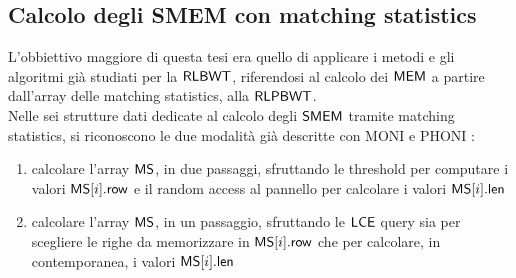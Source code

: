 \subsection{Calcolo degli SMEM con matching statistics}
L'obbiettivo maggiore di questa tesi era quello di applicare i metodi e gli
algoritmi già 
studiati per la $\mbox{\rm {\sf RLBWT}}$, riferendosi al calcolo dei $\mbox{\rm {\sf MEM}}$ a partire
dall'array delle matching statistics, alla $\mbox{\rm {\sf RLPBWT}}$.\\
Nelle sei strutture dati dedicate al calcolo degli $\mbox{\rm {\sf SMEM}}$ tramite matching
statistics, si riconoscono le due modalità già descritte con MONI \cite{moni} e
PHONI \cite{phoni}:
\begin{enumerate}
  \item calcolare l'array $\mbox{\rm {\sf MS}}$, in due passaggi, sfruttando le threshold per
  computare i valori $\mbox{\rm {\sf MS}}[i].\mbox{\rm {\sf row}}$ e il
  random access al pannello per calcolare i valori $\mbox{\rm {\sf MS}}[i].\mbox{\rm {\sf len}}$
  \item calcolare l'array $\mbox{\rm {\sf MS}}$, in un passaggio, sfruttando le $\mbox{\rm {\sf LCE}}$ query
  sia per scegliere le righe da memorizzare in $\mbox{\rm {\sf MS}}[i].\mbox{\rm {\sf row}}$ che per calcolare,
  in contemporanea, i valori $\mbox{\rm {\sf MS}}[i].\mbox{\rm {\sf len}}$ 
\end{enumerate}
